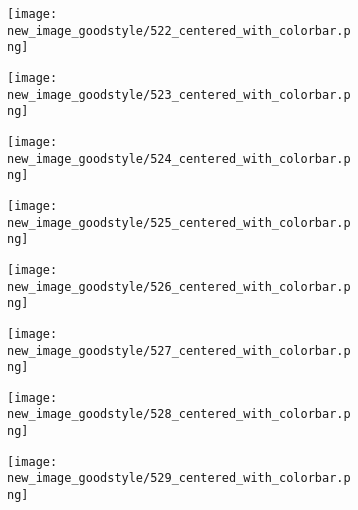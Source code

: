 \documentclass[a4paper,12pt]{article}
\begin{document}
\begin{figure}[H]
  \begin{subfigure}{0.11\textwidth}
    \texttt{[image: new\_image\_goodstyle/522\_centered\_with\_colorbar.png]}
  \end{subfigure}
  \hfill
  \begin{subfigure}{0.11\textwidth}
    \texttt{[image: new\_image\_goodstyle/523\_centered\_with\_colorbar.png]}
  \end{subfigure}
  \hfill
  \begin{subfigure}{0.11\textwidth}
    \texttt{[image: new\_image\_goodstyle/524\_centered\_with\_colorbar.png]}
  \end{subfigure}
  \hfill
  \begin{subfigure}{0.11\textwidth}
    \texttt{[image: new\_image\_goodstyle/525\_centered\_with\_colorbar.png]}
  \end{subfigure}
  \hfill
  \begin{subfigure}{0.11\textwidth}
    \texttt{[image: new\_image\_goodstyle/526\_centered\_with\_colorbar.png]}
  \end{subfigure}
  \hfill
  \begin{subfigure}{0.11\textwidth}
    \texttt{[image: new\_image\_goodstyle/527\_centered\_with\_colorbar.png]}
  \end{subfigure}
  \hfill
  \begin{subfigure}{0.11\textwidth}
    \texttt{[image: new\_image\_goodstyle/528\_centered\_with\_colorbar.png]}
  \end{subfigure}
  \hfill
  \begin{subfigure}{0.11\textwidth}
    \texttt{[image: new\_image\_goodstyle/529\_centered\_with\_colorbar.png]}
  \end{subfigure}
  \hfill
\end{figure}
\end{document}
